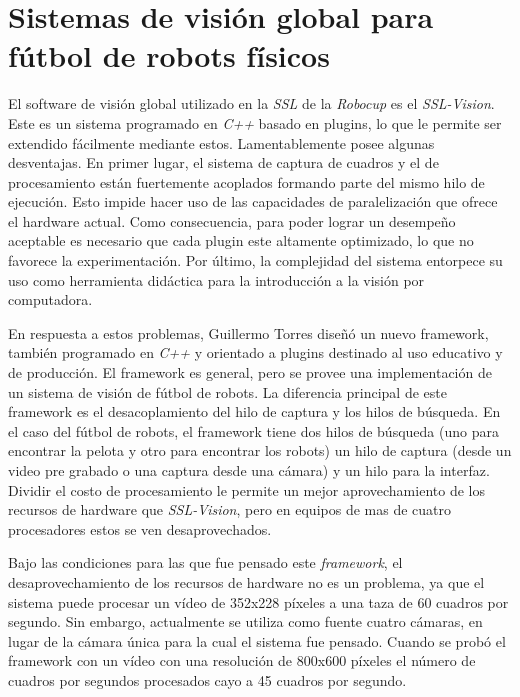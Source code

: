 
\section{Sistemas de visión global para fútbol de robots físicos}


El software de visión global utilizado en la \emph{SSL} de la \emph{Robocup} es
el \emph{SSL-Vision}\cite{sslvision}. Este es un sistema programado en
\emph{C++} basado en plugins, lo que le permite ser extendido fácilmente
mediante estos. Lamentablemente posee algunas desventajas. En primer lugar, el
sistema de captura de cuadros y el de procesamiento están fuertemente
acoplados formando parte del mismo hilo de ejecución. Esto impide hacer uso de
las capacidades de paralelización que ofrece el hardware actual. Como
consecuencia, para poder lograr un desempeño aceptable es necesario que cada
plugin este altamente optimizado, lo que no favorece la experimentación. Por
último, la complejidad del sistema entorpece su uso como herramienta didáctica
para la introducción a la visión por computadora.

En respuesta a estos problemas, Guillermo Torres\cite{torres2012, torres2014}
diseñó un nuevo framework, también programado en \emph{C++} y orientado a
plugins destinado al uso educativo y de producción. El framework es general,
pero se provee una implementación de un sistema de visión de fútbol de robots.
La diferencia principal de este framework es el desacoplamiento del hilo de
captura y los hilos de búsqueda. En el caso del fútbol de robots, el framework
tiene dos hilos de búsqueda (uno para encontrar la pelota y otro para encontrar
los robots) un hilo de captura (desde un video pre grabado o una captura desde
una cámara) y un hilo para la interfaz. Dividir el costo de procesamiento le
permite un mejor aprovechamiento de los recursos de hardware que
\emph{SSL-Vision}, pero en equipos de mas de cuatro procesadores estos se ven
desaprovechados.

Bajo las condiciones para las que fue pensado este \emph{framework}, el
desaprovechamiento de los recursos de hardware no es un problema, ya que el
sistema puede procesar un vídeo de 352x228 píxeles a una taza de 60 cuadros por
segundo. Sin embargo, actualmente se utiliza como fuente cuatro cámaras, en
lugar de la cámara única para la cual el sistema fue pensado. Cuando se probó el
framework con un vídeo con una resolución de 800x600 píxeles el número de
cuadros por segundos procesados cayo a 45 cuadros por segundo.
